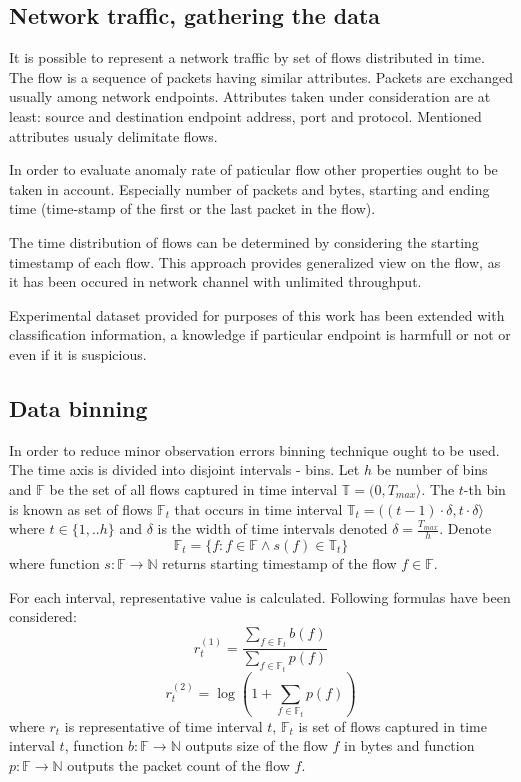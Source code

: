 \documentclass[a4paper,journal]{IEEEtran}
\begin{document}
\subsection{Network traffic, gathering the data}
It is possible to represent a network traffic by set of flows distributed in time. The flow is a sequence of packets having  similar attributes. Packets are exchanged usually among network endpoints. Attributes taken under consideration are at least: source and destination endpoint address, port and protocol. Mentioned attributes usualy delimitate flows.

In order to evaluate anomaly rate of paticular flow other properties ought to be taken in account. Especially number of packets and bytes, starting and ending time (time-stamp of the first or the last packet in the flow).

The time distribution of flows can be determined by considering the starting timestamp of each flow. This approach provides generalized view on the flow, as it has been occured in network channel with unlimited throughput.

Experimental dataset provided for purposes of this work has been extended with classification information, a knowledge if particular endpoint is harmfull or not or even if it is suspicious.

\subsection{Data binning}
In order to reduce minor observation errors binning technique ought to be used. The time axis is divided into disjoint intervals - bins. Let $h$ be number of bins and $\mathbb{F}$ be the set of all flows captured in time interval $\mathbb{T} = (0, T_{max}\rangle $. The $t$-th bin is known as  set of flows $\mathbb{F}_t$ that occurs in time interval $\mathbb{T}_t = ((t-1)\cdot \delta, t\cdot \delta\rangle $ where $t \in \{1, .. h\}$ and $\delta$ is the width of time intervals denoted $\delta = \frac{T_{max}}{h}$. Denote
\begin{equation}
\mathbb{F}_t = \{f : f \in \mathbb{F} \wedge s(f) \in \mathbb{T}_t \}
\end{equation}
where function $s:\mathbb{F} \rightarrow \mathbb{N} $ 
returns starting timestamp of the flow $f\in \mathbb{F}$.

For each interval,
representative value is calculated. Following formulas have been considered:
\begin{equation}
r_t^{(1)} = \frac{\sum\limits_{f\in \mathbb{F}_t}b(f)}{\sum\limits_{f\in \mathbb{F}_t}p(f)}
\end{equation}
\begin{equation}
r_t^{(2)} = \log(1+\sum\limits_{f\in \mathbb{F}_t}p(f))
\end{equation}
where $r_t$ is representative of time interval $t$, $\mathbb{F}_t$ is set of flows captured in time 
interval $t$, function $b:\mathbb{F} \rightarrow \mathbb{N}$ outputs size of the flow $f$ in bytes and function 
$p:\mathbb{F} \rightarrow \mathbb{N}$ outputs the packet count of the flow $f$.
\end{document}

